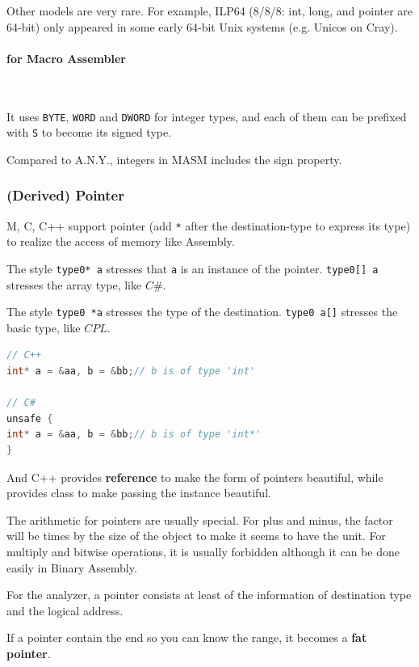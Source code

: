 Other models are very rare. For example, ILP64 (8/8/8: int, long, and pointer are 64-bit) only appeared in some early 64-bit Unix systems (e.g. Unicos on Cray).



\paragraph{for Macro Assembler} \

It uses \verb|BYTE|, \verb|WORD| and \verb|DWORD| for integer types, and each of them can be prefixed with \verb|S| to become its signed type.

Compared to A.N.Y., integers in MASM includes the sign property.



\subsubsection{(Derived) Pointer}

M, C, C++ support pointer (add \verb|*| after the destination-type to express its type) to realize the access of memory like Assembly.

The style \verb|type0* a| stresses that \verb|a| is an instance of the pointer. \verb|type0[] a| stresses the array type, like $C\#$.

The style \verb|type0 *a| stresses the type of the destination. \verb|type0 a[]| stresses the basic type, like $CPL$.

\begin{lstlisting}[language=C++]
// C++
int* a = &aa, b = &bb;// b is of type 'int'

// C#
unsafe {
int* a = &aa, b = &bb;// b is of type 'int*'
}
\end{lstlisting}

And C++ provides \textbf{reference} to make the form of pointers beautiful, while provides class to make passing the instance beautiful.

The arithmetic for pointers are usually special. For plus and minus, the factor will be times by the size of the object to make it seems to have the unit. For multiply and bitwise operations, it is usually forbidden although it can be done easily in Binary Assembly.

For the analyzer, a pointer consists at least of the information of destination type and the logical address.

If a pointer contain the end so you can know the range, it becomes a \textbf{fat pointer}.



